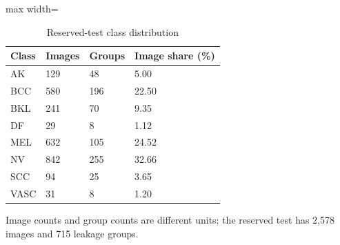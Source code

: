 \begin{table}[t]
\centering
\small
\caption{Reserved-test class distribution}
\label{tab:02-reserved-class-support}
\begin{adjustbox}{max width=\textwidth}
\begin{tabular}{llll}
\toprule
\textbf{Class} & \textbf{Images} & \textbf{Groups} & \textbf{Image share (\%)} \\
\midrule
AK & 129 & 48 & 5.00 \\
BCC & 580 & 196 & 22.50 \\
BKL & 241 & 70 & 9.35 \\
DF & 29 & 8 & 1.12 \\
MEL & 632 & 105 & 24.52 \\
NV & 842 & 255 & 32.66 \\
SCC & 94 & 25 & 3.65 \\
VASC & 31 & 8 & 1.20 \\
\bottomrule
\end{tabular}
\end{adjustbox}
\par\smallskip
\begin{minipage}{\textwidth}\footnotesize Image counts and group counts are different units; the reserved test has 2,578 images and 715 leakage groups.\end{minipage}
\end{table}
